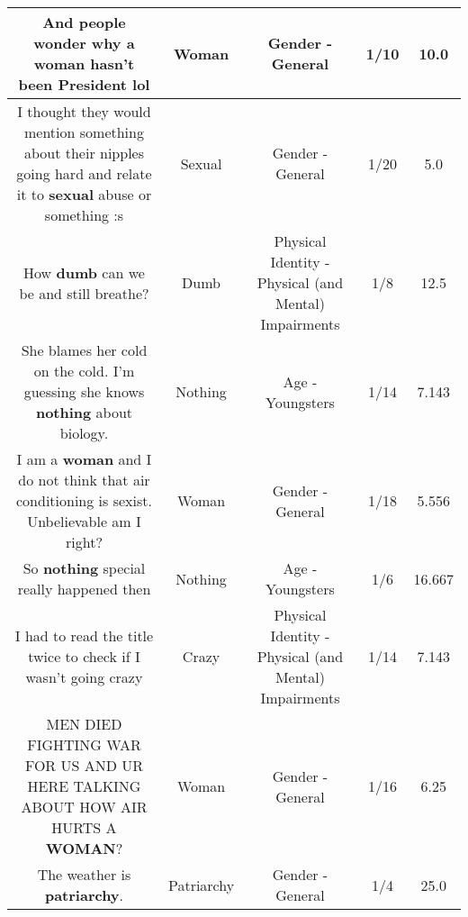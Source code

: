 \documentclass[11pt]{article}
\newlength\mylength
\begin{document}
\begin{center}
\begin{longtable}{|C{.65\mylength}|C{.30\mylength}|C{.12\mylength}|C{.12\mylength}|C{.12\mylength}|}
  \small And people wonder why a \textbf{woman} hasn't been President lol\normalsize   & Woman & Gender - General & 1/10 & 10.0 \\  \hline
  \small I thought they would mention something about their nipples going hard and relate it to \textbf{sexual} abuse or something :s\normalsize   & Sexual & Gender - General & 1/20 & 5.0 \\  \hline
  \small How \textbf{dumb} can we be and still breathe?\normalsize   & Dumb & Physical Identity - Physical (and Mental) Impairments & 1/8 & 12.5 \\  \hline
  \small She blames her cold on the cold. I'm guessing she knows \textbf{nothing} about biology.\normalsize   & Nothing & Age - Youngsters & 1/14 & 7.143 \\  \hline
  \small I am a \textbf{woman} and I do not think that air conditioning is sexist. Unbelievable am I right?\normalsize   & Woman & Gender - General & 1/18 & 5.556 \\  \hline
  \small So \textbf{nothing} special really happened then\normalsize   & Nothing & Age - Youngsters & 1/6 & 16.667 \\  \hline
  \small I had to read the title twice to check if I wasn't going crazy\normalsize   & Crazy & Physical Identity - Physical (and Mental) Impairments & 1/14 & 7.143 \\  \hline
  \small MEN DIED FIGHTING WAR FOR US AND UR HERE TALKING ABOUT HOW AIR HURTS A \textbf{WOMAN}?\normalsize   & Woman & Gender - General & 1/16 & 6.25 \\  \hline
  \small The weather is \textbf{patriarchy}.\normalsize   & Patriarchy & Gender - General & 1/4 & 25.0 \\  \hline

\end{longtable}
\end{center}
\end{document}
